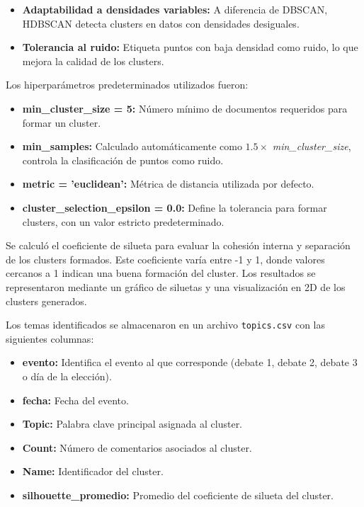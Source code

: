 \documentclass[10pt, a4paper]{article}
\begin{document}
	\begin{itemize}
		\item \textbf{Adaptabilidad a densidades variables:} A diferencia de DBSCAN, HDBSCAN detecta clusters en datos con densidades desiguales.
		\item \textbf{Tolerancia al ruido:} Etiqueta puntos con baja densidad como ruido, lo que mejora la calidad de los clusters.
	\end{itemize}
	
	Los hiperparámetros predeterminados utilizados fueron:
	\begin{itemize}
		\item \textbf{min\_cluster\_size = 5:} Número mínimo de documentos requeridos para formar un cluster.
		\item \textbf{min\_samples:} Calculado automáticamente como \(1.5 \times\) \textit{min\_cluster\_size}, controla la clasificación de puntos como ruido.
		\item \textbf{metric = 'euclidean':} Métrica de distancia utilizada por defecto.
		\item \textbf{cluster\_selection\_epsilon = 0.0:} Define la tolerancia para formar clusters, con un valor estricto predeterminado.
	\end{itemize}

	Se calculó el coeficiente de silueta para evaluar la cohesión interna y separación de los clusters formados. Este coeficiente varía entre -1 y 1, donde valores cercanos a 1 indican una buena formación del cluster. Los resultados se representaron mediante un gráfico de siluetas y una visualización en 2D de los clusters generados.
	
	Los temas identificados se almacenaron en un archivo \texttt{topics.csv} con las siguientes columnas:
	\begin{itemize}
		\item \textbf{evento:} Identifica el evento al que corresponde (debate 1, debate 2, debate 3 o día de la elección).
		\item \textbf{fecha:} Fecha del evento.
		\item \textbf{Topic:} Palabra clave principal asignada al cluster.
		\item \textbf{Count:} Número de comentarios asociados al cluster.
		\item \textbf{Name:} Identificador del cluster.
		\item \textbf{silhouette\_promedio:} Promedio del coeficiente de silueta del cluster.
	\end{itemize}
	
\end{document}
